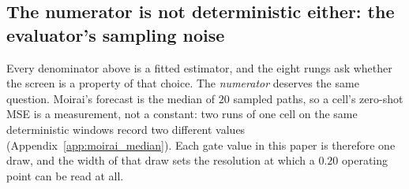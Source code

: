\begin{table}[ht]
\centering
\caption{\textbf{The same comparison on the \emph{held-out} windows.}  The
direction reverses: the matched map is stronger on 7 of 21 cells here against 12
of 21 on the selection windows, because the larger design matrix generalises away
from its fit region worse.  Generated by
\texttt{scripts/matched\_lookback\_gate.py --split test}.}
\label{tab:matchedlb}

\end{table}

\subsection{The numerator is not deterministic either: the evaluator's sampling noise}
\label{app:zsnoise}

Every denominator above is a fitted estimator, and the eight rungs ask whether the
screen is a property of that choice.  The \emph{numerator} deserves the same
question.  Moirai's forecast is the median of $20$ sampled paths, so a cell's
zero-shot MSE is a measurement, not a
constant: two runs of one cell on the same deterministic windows record two
different values (Appendix~\ref{app:moirai_median}).  Each gate value in this paper
is therefore one draw, and the width of that draw sets the resolution at which a
$0.20$ operating point can be read at all.

